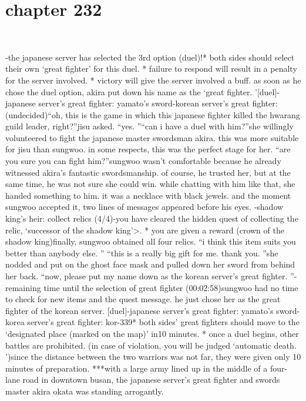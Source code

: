 \section{chapter 232}

                             




-the japanese server has selected the 3rd option (duel)!* both sides should select their own ‘great fighter’ for this duel.
* failure to respond will result in a penalty for the server involved.
* victory will give the server involved a buff.
as soon as he chose the duel option, akira put down his name as the ‘great fighter.
’[duel]-japanese server’s great fighter: yamato’s sword-korean server’s great fighter: (undecided)“oh, this is the game in which this japanese fighter killed the hwarang guild leader, right?”jisu asked.
“yes.
”“can i have a duel with him?”she willingly volunteered to fight the japanese master swordsman akira.
 this was more suitable for jisu than sungwoo.
 in some respects, this was the perfect stage for her.
“are you sure you can fight him?”sungwoo wasn’t comfortable because he already witnessed akira’s fantastic swordsmanship.
 of course, he trusted her, but at the same time, he was not sure she could win.
while chatting with him like that, she handed something to him.
 it was a necklace with black jewels.
 and the moment sungwoo accepted it, two lines of messages appeared before his eyes.
-shadow king’s heir: collect relics (4/4)-you have cleared the hidden quest of collecting the relic, ‘successor of the shadow king’>.
* you are given a reward (crown of the shadow king)finally, sungwoo obtained all four relics.
“i think this item suits you better than anybody else.
”
“this is a really big gift for me.
 thank you.
”she nodded and put on the ghost face mask and pulled down her sword from behind her back.
“now, please put my name down as the korean server’s great fighter.
”-remaining time until the selection of great fighter (00:02:58)sungwoo had no time to check for new items and the quest message.
he just chose her as the great fighter of the korean server.
[duel]-japanese server’s great fighter: yamato’s sword-korea server’s great fighter: kor-339* both sides’ great fighters should move to the ‘designated place (marked on the map)’ in10 minutes.
* once a duel begins, other battles are prohibited.
 (in case of violation, you will be judged ‘automatic death.
’)since the distance between the two warriors was not far, they were given only 10 minutes of preparation.
***with a large army lined up in the middle of a four-lane road in downtown busan, the japanese server’s great fighter and swords master akira okata was standing arrogantly.
